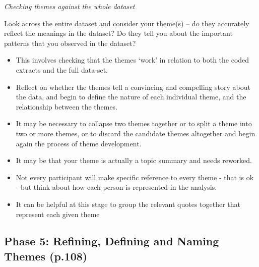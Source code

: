\documentclass[
  english,
  letterpaper,
  DIV=11,
  numbers=noendperiod]{scrreprt}
\providecommand{\tightlist}{%
  \setlength{\itemsep}{0pt}\setlength{\parskip}{0pt}}
\begin{document}
\emph{Checking themes against the whole dataset}

Look across the entire dataset and consider your theme(s) -- do they
accurately reflect the meanings in the dataset? Do they tell you about
the important patterns that you observed in the dataset?

\begin{tcolorbox}[enhanced jigsaw, breakable, bottomtitle=1mm, leftrule=.75mm, opacityback=0, colbacktitle=quarto-callout-warning-color!10!white, opacitybacktitle=0.6, toprule=.15mm, colback=white, left=2mm, coltitle=black, bottomrule=.15mm, titlerule=0mm, title={Practical Steps}, toptitle=1mm, colframe=quarto-callout-warning-color-frame, arc=.35mm, rightrule=.15mm]

\begin{itemize}
\tightlist
\item
  This involves checking that the themes `work' in relation to both the
  coded extracts and the full data-set.
\item
  Reflect on whether the themes tell a convincing and compelling story
  about the data, and begin to define the nature of each individual
  theme, and the relationship between the themes.
\item
  It may be necessary to collapse two themes together or to split a
  theme into two or more themes, or to discard the candidate themes
  altogether and begin again the process of theme development.
\item
  It may be that your theme is actually a topic summary and needs
  reworked.
\item
  Not every participant will make specific reference to every theme -
  that is ok - but think about how each person is represented in the
  analysis.
\item
  It can be helpful at this stage to group the relevant quotes together
  that represent each given theme
\end{itemize}

\end{tcolorbox}

\subsection{Phase 5: Refining, Defining and Naming Themes
(p.108)}\label{phase-5-refining-defining-and-naming-themes-p.108}
\end{document}
